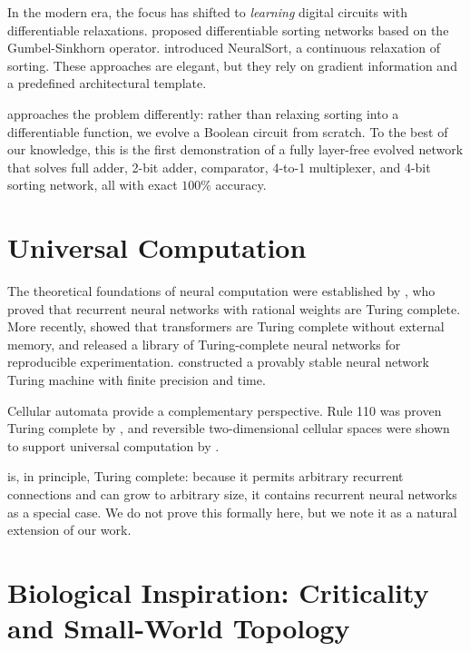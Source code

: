 In the modern era, the focus has shifted to \emph{learning} digital
circuits with differentiable relaxations. \citet{petersen2022deep}
proposed differentiable sorting networks based on the
Gumbel-Sinkhorn operator. \citet{grover2019differentiable} introduced
NeuralSort, a continuous relaxation of sorting. These approaches are
elegant, but they rely on gradient information and a predefined
architectural template.

\modnet{} approaches the problem differently: rather than relaxing
sorting into a differentiable function, we evolve a Boolean circuit
from scratch. To the best of our knowledge, this is the first
demonstration of a fully layer-free evolved network that solves full
adder, 2-bit adder, comparator, 4-to-1 multiplexer, and 4-bit sorting
network, all with exact $100\%$ accuracy.

\section{Universal Computation}
\label{sec:related-universal}

The theoretical foundations of neural computation were established by
\citet{siegelmann1995computational}, who proved that recurrent neural
networks with rational weights are Turing complete. More recently,
\citet{perez2021turing} showed that transformers are Turing complete
without external memory, and \citet{bates2026pytorch} released a
library of Turing-complete neural networks for reproducible
experimentation. \citet{stogin2024provably} constructed a provably
stable neural network Turing machine with finite precision and time.

Cellular automata provide a complementary perspective. Rule 110 was
proven Turing complete by \citet{cook2004universality}, and reversible
two-dimensional cellular spaces were shown to support universal
computation by \citet{morita2002universal}.

\modnet{} is, in principle, Turing complete: because it permits
arbitrary recurrent connections and can grow to arbitrary size, it
contains recurrent neural networks as a special case. We do not prove
this formally here, but we note it as a natural extension of our work.

\section{Biological Inspiration: Criticality and Small-World Topology}
\label{sec:related-biology}

